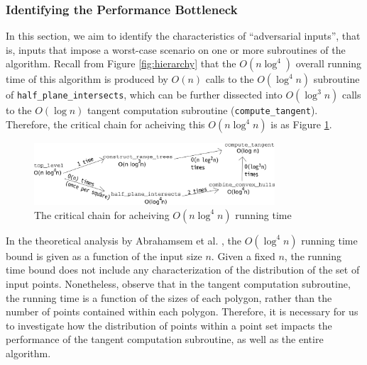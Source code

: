 \documentclass{article}
\newcommand{\figref}[1]{Figure \ref{#1}}
\begin{document}
\subsubsection{Identifying the Performance Bottleneck}

In this section, we aim to identify the characteristics of ``adversarial inputs'', that is, inputs that impose a worst-case scenario on one or more subroutines of the algorithm. Recall from \figref{fig:hierarchy} that the $O(n\log^4)$ overall running time of this algorithm is produced by $O(n)$ calls to the $O(\log^4 n)$ subroutine of \texttt{half\_plane\_intersects}, which can be further dissected into $O(\log^3 n)$ calls to the $O(\log n)$ tangent computation subroutine (\texttt{compute\_tangent}). Therefore, the critical chain for acheiving this $O(n \log^4 n)$ is as \figref{fig:tangent_dependencies}.

\begin{figure}[ht]
    \centering
    \includegraphics[width=0.8\textwidth]{tangent_dependencies}
    \caption{The critical chain for acheiving $O(n \log^4 n)$ running time}
    \label{fig:tangent_dependencies}
\end{figure}

In the theoretical analysis by Abrahamsem et al. \cite{abb17}, the $O(\log^4 n)$ running time bound is given as a function of the input size $n$. Given a fixed $n$, the running time bound does not include any characterization of the distribution of the set of input points. Nonetheless, observe that in the tangent computation subroutine, the running time is a function of the sizes of each polygon, rather than the number of points contained within each polygon. Therefore, it is necessary for us to investigate how the distribution of points within a point set impacts the performance of the tangent computation subroutine, as well as the entire algorithm.
\end{document}

